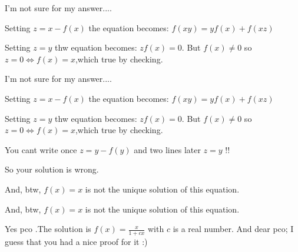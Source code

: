 \begin{solution}
	I'm not sure for my answer....

Setting $ z=x-f(x)$ the equation becomes:
$ f(xy)=yf(x)+f(xz)$

Setting $ z=y$ thw equation becomes:
$ zf(x)=0$.
But $ f(x) \not =0$ so $ z=0 \Longleftrightarrow f(x)=x$,which true by checking.
\end{solution}



\begin{solution}
	\begin{tcolorbox}I'm not sure for my answer....

Setting $ z = x - f(x)$ the equation becomes:
$ f(xy) = yf(x) + f(xz)$

Setting $ z = y$ thw equation becomes:
$ zf(x) = 0$.
But $ f(x) \not = 0$ so $ z = 0 \Longleftrightarrow f(x) = x$,which true by checking.\end{tcolorbox}

You cant write once $ z=y-f(y)$ and two lines later $ z=y$ !!

So your solution is wrong.

And, btw, $ f(x)=x$ is not the unique solution of this equation.
\end{solution}



\begin{solution}
	\begin{tcolorbox}

And, btw, $ f(x) = x$ is not the unique solution of this equation.\end{tcolorbox}
Yes pco   .The solution is $ f(x) = \frac {x}{1 + cx}$ with $ c$ is a real number.
And dear pco; I guess that  you had a nice proof for it  :)
\end{solution}






